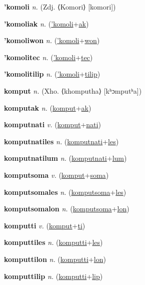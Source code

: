 \textbf{\hypertarget{'komoli}{'komoli}} \textit{n.} (Zdj. ⟨Komori⟩ [komori])


\textbf{\hypertarget{'komoliak}{'komoliak}} \textit{n.} (\hyperlink{'komoli}{'komoli}+\allowbreak \hyperlink{ak}{ak})


\textbf{\hypertarget{'komoliwon}{'komoliwon}} \textit{n.} (\hyperlink{'komoli}{'komoli}+\allowbreak \hyperlink{won}{won})


\textbf{\hypertarget{'komolitec}{'komolitec}} \textit{n.} (\hyperlink{'komoli}{'komoli}+\allowbreak \hyperlink{tec}{tec})


\textbf{\hypertarget{'komolitilip}{'komolitilip}} \textit{n.} (\hyperlink{'komoli}{'komoli}+\allowbreak \hyperlink{tilip}{tilip})


\textbf{\hypertarget{komput}{komput}} \textit{n.} (Xho. ⟨khomputha⟩ [kʰɔmputʰa])


\textbf{\hypertarget{komputak}{komputak}} \textit{n.} (\hyperlink{komput}{komput}+\allowbreak \hyperlink{ak}{ak})


\textbf{\hypertarget{komputnati}{komputnati}} \textit{v.} (\hyperlink{komput}{komput}+\allowbreak \hyperlink{nati}{nati})


\textbf{\hypertarget{komputnatiles}{komputnatiles}} \textit{n.} (\hyperlink{komputnati}{komputnati}+\allowbreak \hyperlink{les}{les})


\textbf{\hypertarget{komputnatilum}{komputnatilum}} \textit{n.} (\hyperlink{komputnati}{komputnati}+\allowbreak \hyperlink{lum}{lum})


\textbf{\hypertarget{komputsoma}{komputsoma}} \textit{v.} (\hyperlink{komput}{komput}+\allowbreak \hyperlink{soma}{soma})


\textbf{\hypertarget{komputsomales}{komputsomales}} \textit{n.} (\hyperlink{komputsoma}{komputsoma}+\allowbreak \hyperlink{les}{les})


\textbf{\hypertarget{komputsomalon}{komputsomalon}} \textit{n.} (\hyperlink{komputsoma}{komputsoma}+\allowbreak \hyperlink{lon}{lon})


\textbf{\hypertarget{komputti}{komputti}} \textit{v.} (\hyperlink{komput}{komput}+\allowbreak \hyperlink{ti}{ti})


\textbf{\hypertarget{komputtiles}{komputtiles}} \textit{n.} (\hyperlink{komputti}{komputti}+\allowbreak \hyperlink{les}{les})


\textbf{\hypertarget{komputtilon}{komputtilon}} \textit{n.} (\hyperlink{komputti}{komputti}+\allowbreak \hyperlink{lon}{lon})


\textbf{\hypertarget{komputtilip}{komputtilip}} \textit{n.} (\hyperlink{komputti}{komputti}+\allowbreak \hyperlink{lip}{lip})


